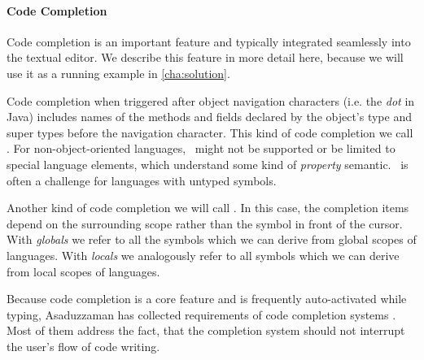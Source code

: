 \documentclass[sigplan,10pt,review,anonymous]{acmart}
\begin{document}
\paragraph{Code Completion}
Code completion is an important feature and typically integrated seamlessly into
the textual editor. We describe this feature in more detail here, because we
will use it as a running example in \autoref{cha:solution}.

Code completion when triggered after object navigation characters (i.e. the
\emph{dot} in Java) includes names of the methods and fields declared by the
object's type and super types before the navigation character. This kind of code
completion we call \completionOfProperties. For non-object-oriented languages,
\completionOfProperties~might not be supported or be limited to special language
elements, which understand some kind of \emph{property}
semantic. \CompletionOfProperties~is often a challenge for languages with
untyped symbols.

Another kind of code completion we will call \completionOfGlobaslAndLocals. In
this case, the completion items depend on the surrounding scope rather than the
symbol in front of the cursor. With \emph{globals} we refer to all the symbols
which we can derive from global scopes of languages. With \emph{locals} we
analogously refer to all symbols which we can derive from local scopes of
languages. %

Because code completion is a core feature and is frequently auto-activated while
typing, Asaduzzaman has collected requirements of code completion systems
\cite{asaduzzaman2018context}. Most of them address the fact, that the
completion system should not interrupt the user's flow of code writing.


\end{document}
